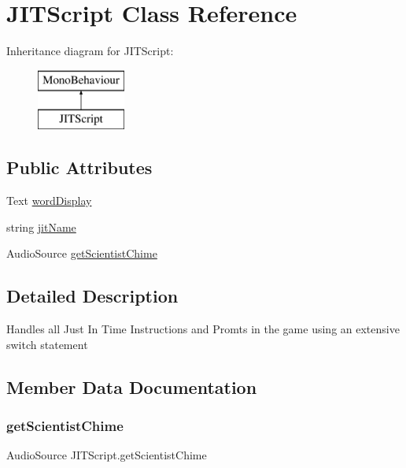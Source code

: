 \hypertarget{class_j_i_t_script}{}\section{J\+I\+T\+Script Class Reference}
\label{class_j_i_t_script}
Inheritance diagram for J\+I\+T\+Script\+:\begin{figure}[H]
\begin{center}
\leavevmode
\includegraphics[height=2.000000cm]{class_j_i_t_script}
\end{center}
\end{figure}
\subsection*{Public Attributes}
\begin{DoxyCompactItemize}
\item 
Text \hyperlink{class_j_i_t_script_a033821b78a287d85204d336682fc6ee2}{word\+Display}
\item 
string \hyperlink{class_j_i_t_script_a47cba90f798093a7568d746789846520}{jit\+Name}
\item 
Audio\+Source \hyperlink{class_j_i_t_script_a3d065d627b861465a7c4da4c1ca9fdfd}{get\+Scientist\+Chime}
\end{DoxyCompactItemize}


\subsection{Detailed Description}
Handles all Just In Time Instructions and Promts in the game using an extensive switch statement 

\subsection{Member Data Documentation}
\mbox{\label{class_j_i_t_script_a3d065d627b861465a7c4da4c1ca9fdfd}} 
\subsubsection{\texorpdfstring{get\+Scientist\+Chime}{getScientistChime}}
{\footnotesize\ttfamily Audio\+Source J\+I\+T\+Script.\+get\+Scientist\+Chime}

